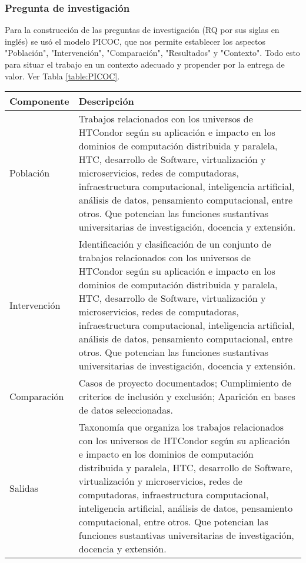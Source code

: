 \subsubsection{Pregunta de investigación}
Para la construcción de las preguntas de investigación (RQ por sus siglas en inglés) se usó el modelo PICOC, que nos permite establecer los aspectos "Población", "Intervención", "Comparación", "Resultados" y "Contexto". Todo esto para situar el trabajo en un contexto adecuado y propender por la entrega de valor. Ver Tabla \ref{table:PICOC}.

\begin{table}[htbp]
	
	\centering
	\renewcommand{\arraystretch}{1.7}  %
	\renewcommand{\tablename}{Tabla}  %
	\setlength{\tabcolsep}{3pt}      %
	\vspace{10pt}                     %
	\begin{tabular}{|>{\arraybackslash}m{1.7cm}|>{\arraybackslash}m{6.3cm}|}
		\hline	
		\textbf{Componente} & \textbf{Descripción} \\
		\hline
		Población & Trabajos relacionados con los universos de HTCondor según su aplicación e impacto en los dominios de computación distribuida y paralela, HTC, desarrollo de Software, virtualización y microservicios, redes de computadoras, infraestructura computacional, inteligencia artificial, análisis de datos, pensamiento computacional, entre otros. Que potencian las funciones sustantivas universitarias de investigación, docencia y extensión.\\
		Intervención & Identificación y clasificación de un conjunto de trabajos relacionados con los universos de HTCondor según su aplicación e impacto en los dominios de computación distribuida y paralela, HTC, desarrollo de Software, virtualización y microservicios, redes de computadoras, infraestructura computacional, inteligencia artificial, análisis de datos, pensamiento computacional, entre otros. Que potencian las funciones sustantivas universitarias de investigación, docencia y extensión.\\
		Comparación & Casos de proyecto documentados; Cumplimiento de criterios de inclusión y exclusión;
		Aparición en bases de datos seleccionadas.\\
		Salidas & Taxonomía que organiza los trabajos relacionados con los universos de HTCondor según su aplicación e impacto en los dominios de computación distribuida y paralela, HTC, desarrollo de Software, virtualización y microservicios, redes de computadoras, infraestructura computacional, inteligencia artificial, análisis de datos, pensamiento computacional, entre otros. Que potencian las funciones sustantivas universitarias de investigación, docencia y extensión.\\

\end{tabular}
\end{table}
